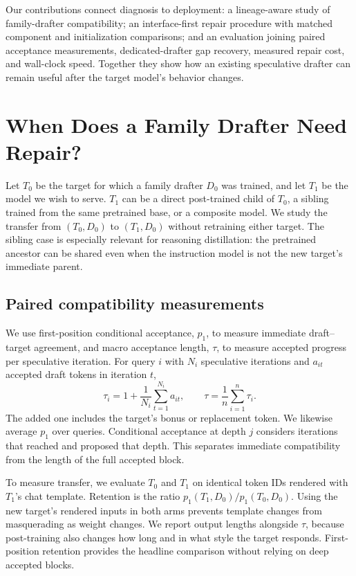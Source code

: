 \documentclass[11pt]{article}
\begin{document}
Our contributions connect diagnosis to deployment: a lineage-aware study of family-drafter compatibility; an interface-first repair procedure with matched component and initialization comparisons; and an evaluation joining paired acceptance measurements, dedicated-drafter gap recovery, measured repair cost, and wall-clock speed. Together they show how an existing speculative drafter can remain useful after the target model's behavior changes.



\section{When Does a Family Drafter Need Repair?}
\label{sec:study}
Let $T_0$ be the target for which a family drafter $D_0$ was trained, and let $T_1$ be the model we wish to serve. $T_1$ can be a direct post-trained child of $T_0$, a sibling trained from the same pretrained base, or a composite model. We study the transfer from $(T_0,D_0)$ to $(T_1,D_0)$ without retraining either target. The sibling case is especially relevant for reasoning distillation: the pretrained ancestor can be shared even when the instruction model is not the new target's immediate parent.

\subsection{Paired compatibility measurements}
We use first-position conditional acceptance, $p_1$, to measure immediate draft--target agreement, and macro acceptance length, $\tau$, to measure accepted progress per speculative iteration. For query $i$ with $N_i$ speculative iterations and $a_{it}$ accepted draft tokens in iteration $t$,
\begin{equation}
\tau_i = 1 + \frac{1}{N_i}\sum_{t=1}^{N_i} a_{it},
\qquad \tau=\frac{1}{n}\sum_{i=1}^{n}\tau_i.
\label{eq:tau}
\end{equation}
The added one includes the target's bonus or replacement token. We likewise average $p_1$ over queries. Conditional acceptance at depth $j$ considers iterations that reached and proposed that depth. This separates immediate compatibility from the length of the full accepted block.

To measure transfer, we evaluate $T_0$ and $T_1$ on identical token IDs rendered with $T_1$'s chat template. Retention is the ratio $p_1(T_1,D_0)/p_1(T_0,D_0)$. Using the new target's rendered inputs in both arms prevents template changes from masquerading as weight changes. We report output lengths alongside $\tau$, because post-training also changes how long and in what style the target responds. First-position retention provides the headline comparison without relying on deep accepted blocks.
\end{document}
